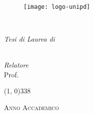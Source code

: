 \begin{titlepage}

\begin{center}

\begin{LARGE}
\textbf{\myUni}\\
\end{LARGE}

\vspace{8pt}

\begin{Large}
\textsc{\myDepartment}\\
\end{Large}

\vspace{8pt}

\begin{large}
\textsc{\myFaculty}\\
\end{large}

\vspace{20pt}
\begin{figure}[htbp]
\begin{center}
\texttt{[image: logo-unipd]}
\end{center}
\end{figure}
\vspace{30pt} 

\begin{LARGE}
\begin{center}
\textbf{\myTitle}\\
\end{center}
\end{LARGE}

\vspace{10pt} 


\vspace{30pt} 

\begin{large}
\begin{flushleft}
\textit{Tesi di Laurea di}\\ 
\vspace{5pt} 
\myName\\
\end{flushleft}
\vspace{0pt} 
\begin{flushright}
\textit{Relatore}\\ 
\vspace{5pt} 
Prof. \myProf
\end{flushright}
\end{large}

\vspace{30pt}

\line(1, 0){338} \\
\begin{normalsize}
\textsc{Anno Accademico \myAA}
\end{normalsize}

\end{center}
\end{titlepage} 